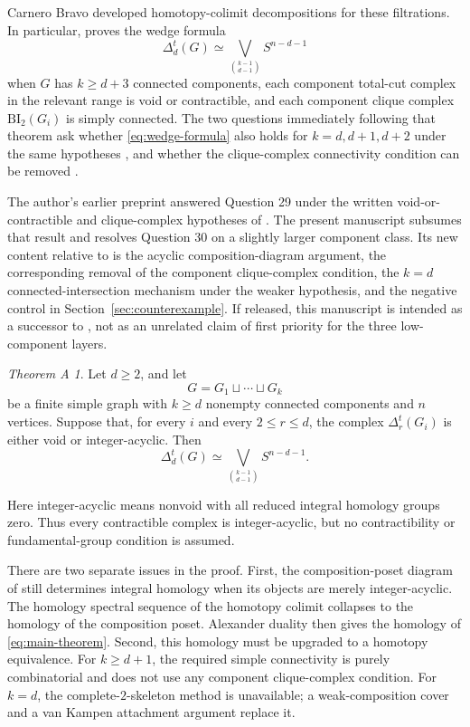 \documentclass[11pt]{article}
\theoremstyle{remark}
\newtheorem*{maintheorem}{Theorem A}
\numberwithin{equation}{section}
\begin{document}
Carnero Bravo \cite{ref2} developed homotopy-colimit decompositions for these
filtrations. In particular, \cite[Theorem 28]{ref2} proves the wedge formula
\begin{equation}
\Delta_d^t(G)\simeq
\bigvee_{\binom{k-1}{d-1}}S^{n-d-1}
\label{eq:wedge-formula}
\end{equation}
when $G$ has $k\geq d+3$ connected components, each component total-cut
complex in the relevant range is void or contractible, and each component
clique complex $\mathrm{BI}_2(G_i)$ is simply connected. The two questions
immediately following that theorem ask whether \eqref{eq:wedge-formula} also
holds for $k=d,d+1,d+2$ under the same hypotheses \cite[Question 29]{ref2},
and whether the clique-complex connectivity condition can be removed
\cite[Question 30]{ref2}.

The author's earlier preprint \cite{ref8} answered Question 29 under the
written void-or-contractible and clique-complex hypotheses of
\cite[Theorem 28]{ref2}. The present manuscript subsumes that result and
resolves Question 30 on a slightly larger component class. Its new content
relative to \cite{ref8} is the acyclic composition-diagram argument, the
corresponding removal of the component clique-complex condition, the $k=d$
connected-intersection mechanism under the weaker hypothesis, and the
negative control in Section~\ref{sec:counterexample}. If released, this
manuscript is intended as a successor to \cite{ref8}, not as an unrelated
claim of first priority for the three low-component layers.

\begin{maintheorem}
Let $d\geq2$, and let
\[
G=G_1\sqcup\cdots\sqcup G_k
\]
be a finite simple graph with $k\geq d$ nonempty connected components and
$n$ vertices. Suppose that, for every $i$ and every $2\leq r\leq d$, the
complex $\Delta_r^t(G_i)$ is either void or integer-acyclic. Then
\begin{equation}
\Delta_d^t(G)\simeq
\bigvee_{\binom{k-1}{d-1}}S^{n-d-1}.
\label{eq:main-theorem}
\end{equation}
\end{maintheorem}

Here integer-acyclic means nonvoid with all reduced integral homology groups
zero. Thus every contractible complex is integer-acyclic, but no
contractibility or fundamental-group condition is assumed.

There are two separate issues in the proof. First, the composition-poset
diagram of \cite{ref2} still determines integral homology when its objects are
merely integer-acyclic. The homology spectral sequence of the homotopy colimit
collapses to the homology of the composition poset. Alexander duality then
gives the homology of \eqref{eq:main-theorem}. Second, this homology must be
upgraded to a homotopy equivalence. For $k\geq d+1$, the required simple
connectivity is purely combinatorial and does not use any component
clique-complex condition. For $k=d$, the complete-$2$-skeleton method is
unavailable; a weak-composition cover and a van Kampen attachment argument
replace it.
\end{document}
